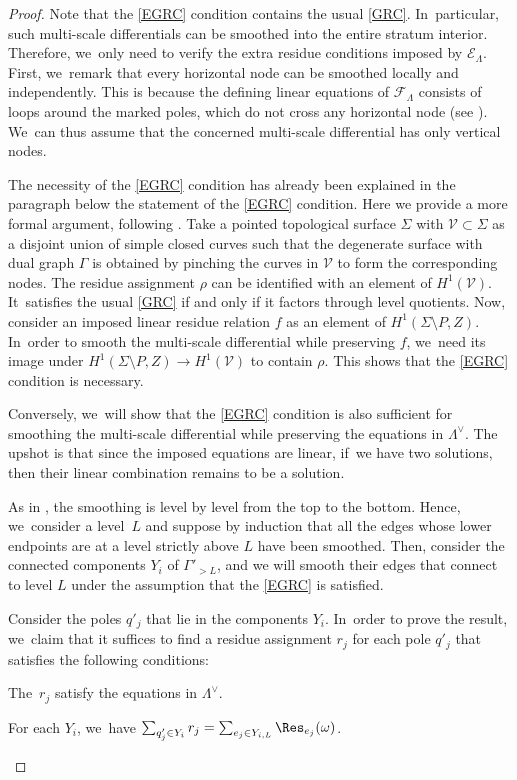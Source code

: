 \begin{proof}
Note that the \ref{EGRC} condition contains the usual \ref{GRC}. In~particular, such multi-scale differentials can be smoothed into the entire stratum interior. Therefore, we~only need to verify the extra residue conditions imposed by $\mathcal{E}_{\Lambda}$. First, we~remark that every horizontal node can be smoothed locally and independently. This is because the defining linear equations of $\mathcal F_{\Lambda}$ consists of loops around the marked poles, which do not cross any horizontal node (see \cite{BDG}). We~can thus assume that the concerned multi-scale differential has only vertical nodes.

The necessity of the \ref{EGRC} condition has already been explained in the paragraph below the statement of the \ref{EGRC} condition. Here we provide a more formal argument,
following \cite[Prop.\,6.3]{BCGGM3}. Take a pointed topological surface $\Sigma$ with $\mathcal{V}\subset \Sigma$ as a disjoint union of simple closed curves such that the degenerate surface with dual graph $\Gamma$ is obtained by
pinching the curves in $\mathcal{V}$ to form the corresponding nodes. The residue assignment $\rho$ can be identified with an element of $H^1(\mathcal{V})$. It~satisfies the usual \ref{GRC} if and only if it factors through level quotients. Now, consider an imposed linear residue relation $f$ as an element of $H^1(\Sigma \setminus P, Z)$. In~order to smooth the multi-scale differential while preserving $f$, we~need its image under $H^1(\Sigma \setminus P, Z) \to H^1(\mathcal{V})$ to contain $\rho$. This shows that the \ref{EGRC} condition is necessary.

Conversely, we~will show that the \ref{EGRC} condition is also sufficient for smoothing the multi-scale differential while preserving the equations in $\Lambda^{\vee}$. The upshot is that since the imposed equations are linear, if~we have two solutions, then their linear combination remains to be a solution.

As in \cite{BCGGM}, the smoothing is level by level from the top to the bottom. Hence, we~consider a level~$L$ and suppose by induction that all the edges whose lower endpoints are at a level strictly above $L$ have been smoothed. Then, consider the connected components $Y_i$ of $\Gamma'_{>L}$, and we will smooth their edges that connect to level $L$ under the assumption that the \ref{EGRC} is satisfied.

Consider the poles $q'_{j}$ that lie in the components $Y_{i}$. In~order to prove the result, we~claim that it suffices to find a residue assignment $r_{j}$ for each pole $q'_{j}$ that satisfies the following conditions:
\begin{enumeratea}
\item\label{enum:a}
The~$r_{j}$ satisfy the equations in $\Lambda^{\vee}$.
\item\label{enum:b}
For each $Y_{i}$, we~have $\sum_{q'_j\in Y_i}r_{j}=\sum_{e_j \in Y_{i, L}} \Res_{e_j} (\omega)$.
\end{enumeratea}


\end{proof}
